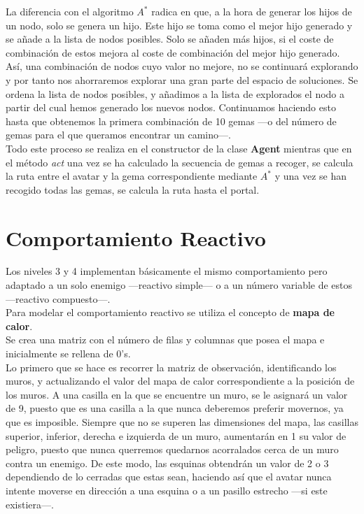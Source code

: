 La diferencia con el algoritmo $ A^{*} $ radica en que, a la hora de generar los hijos de un nodo, solo se genera un hijo. Este hijo se toma como el mejor hijo generado y se añade a la lista de nodos posibles. Solo se añaden más hijos, si el coste de combinación de estos mejora al coste de combinación del mejor hijo generado. Así, una combinación de nodos cuyo valor no mejore, no se continuará explorando y por tanto nos ahorraremos explorar una gran parte del espacio de soluciones. Se ordena la lista de nodos posibles, y añadimos a la lista de explorados el nodo a partir del cual hemos generado los nuevos nodos. Continuamos haciendo esto hasta que obtenemos la primera combinación de 10 gemas ---o del número de gemas para el que queramos encontrar un camino---.\\

Todo este proceso se realiza en el constructor de la clase \textbf{Agent} mientras que en el método \emph{act} una vez se ha calculado la secuencia de gemas a recoger, se calcula la ruta entre el avatar y la gema correspondiente mediante $ A^{*} $ y una vez se han recogido todas las gemas, se calcula la ruta hasta el portal.


\newpage
\chapter{Comportamiento Reactivo}
Los niveles 3 y 4 implementan básicamente el mismo comportamiento pero adaptado a un solo enemigo ---reactivo simple--- o a un  número variable de estos ---reactivo compuesto---.\\

Para modelar el comportamiento reactivo se utiliza el concepto de \textbf{mapa de calor}.\\
Se crea una matriz con el número de filas y columnas que posea el mapa e inicialmente se rellena de 0's.\\
Lo primero que se hace es recorrer la matriz de observación, identificando los muros, y actualizando el valor del mapa de calor correspondiente a la posición de los muros. A una casilla en la que se encuentre un muro, se le asignará un valor de 9, puesto que es una casilla a la que nunca deberemos preferir movernos, ya que es imposible. Siempre que no se superen las dimensiones del mapa, las casillas superior, inferior, derecha e izquierda de un muro, aumentarán en 1 su valor de peligro, puesto que nunca querremos quedarnos acorralados cerca de un muro contra un enemigo. De este modo, las esquinas obtendrán un valor de 2 o 3 dependiendo de lo cerradas que estas sean, haciendo así que el avatar nunca intente moverse en dirección a una esquina o a un pasillo estrecho ---si este existiera---.\\

